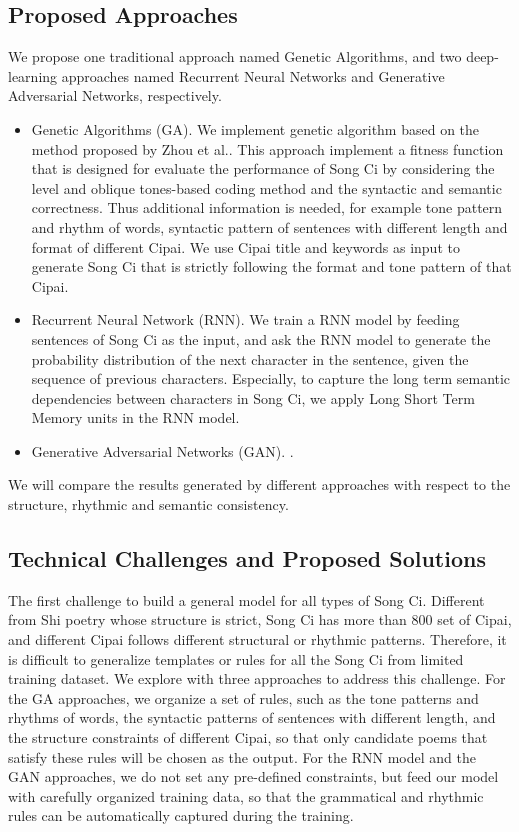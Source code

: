 \subsection{Proposed Approaches}
%
We propose one traditional approach named Genetic Algorithms, and two deep-learning approaches named Recurrent Neural Networks and Generative Adversarial Networks, respectively.
\begin{itemize}
\item { Genetic Algorithms (GA).} 
%
We implement genetic algorithm based on the method proposed by Zhou et al.\cite{zhou2010genetic}.
%
This approach implement a fitness function that is designed for evaluate the performance of Song Ci by considering the level and oblique tones-based coding method and the syntactic and semantic correctness.
%
Thus additional information is needed, for example tone pattern and rhythm of words, syntactic pattern of sentences with different length and format of different Cipai.
%
We use Cipai title and keywords as input to generate Song Ci that is strictly following the format and tone pattern of that Cipai.
\item {Recurrent Neural Network (RNN).} 
%
We train a RNN model by feeding sentences of Song Ci as the input, and ask the RNN model to generate the probability distribution of the next character in the sentence, given the sequence of previous characters.
%
Especially, to capture the long term semantic dependencies between characters in Song Ci,
%
we apply Long Short Term Memory units in the RNN model.
%
\item{Generative Adversarial Networks (GAN).}  .
%
\end{itemize}
We will compare the results generated by different approaches with respect to the structure, rhythmic and semantic consistency. 
 

\subsection{Technical Challenges and Proposed Solutions} 
The first challenge to build a general model for all types of Song Ci.
%
Different from Shi poetry whose structure is strict,  Song Ci has more than 800 set of Cipai, and different Cipai follows different structural or rhythmic patterns.
%
Therefore, it is difficult to generalize templates or rules for all the Song Ci from limited training dataset.
%
We explore with three approaches to address this challenge.
%
For the GA approaches, {we organize a set of rules, such as the tone patterns and rhythms of words, the syntactic patterns of sentences with different length, and the structure constraints of different Cipai, so that only candidate poems that satisfy these rules will be chosen as the output.}
% 
For the RNN model and the GAN approaches, we do not set any pre-defined constraints, but feed our model with carefully organized training data, so that the grammatical and rhythmic rules can be automatically captured during the training.

